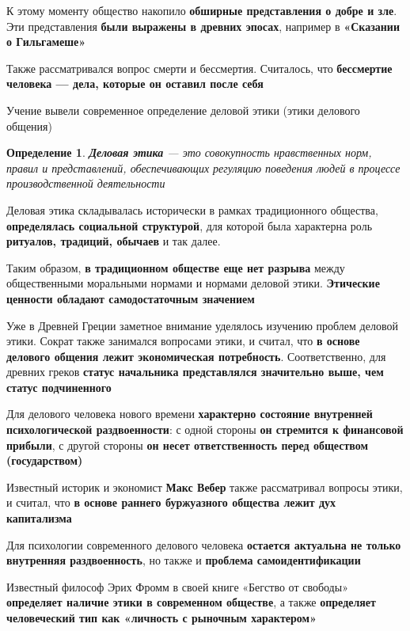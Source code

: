 \documentclass[a4paper,14pt]{extarticle}
\newtheorem{definition}{Определение}
\begin{document}
К этому моменту общество накопило \textbf{обширные представления о добре и зле}. Эти представления \textbf{были выражены в древних эпосах}, например в \textbf{«Сказании о Гильгамеше»}

Также рассматривался вопрос смерти и бессмертия. Считалось, что \textbf{бессмертие человека — дела, которые он оставил после себя}

Учение вывели современное определение деловой этики (этики делового общения)

\begin{definition}
\textbf{Деловая этика} — это совокупность нравственных норм, правил и представлений, обеспечивающих регуляцию поведения людей в процессе производственной деятельности
\end{definition}

Деловая этика складывалась исторически в рамках традиционного общества, \textbf{определялась социальной структурой}, для которой была характерна роль \textbf{ритуалов, традиций, обычаев} и так далее.

Таким образом, \textbf{в традиционном обществе еще нет разрыва} между общественными моральными нормами и нормами деловой этики. \textbf{Этические ценности обладают самодостаточным значением}

Уже в Древней Греции заметное внимание уделялось изучению проблем деловой этики. Сократ также занимался вопросами этики, и считал, что \textbf{в основе делового общения лежит экономическая потребность}. Соответственно, для древних греков \textbf{статус начальника представлялся значительно выше, чем статус подчиненного}

\hfill

Для делового человека нового времени \textbf{характерно состояние внутренней психологической раздвоенности}: с одной стороны \textbf{он стремится к финансовой прибыли}, с другой стороны \textbf{он несет ответственность перед обществом (государством)}

Известный историк и экономист \textbf{Макс Вебер} также рассматривал вопросы этики, и считал, что \textbf{в основе раннего буржуазного общества лежит дух капитализма}

Для психологии современного делового человека \textbf{остается актуальна не только внутренняя раздвоенность}, но также и \textbf{проблема самоидентификации}

Известный философ Эрих Фромм в своей книге «Бегство от свободы» \textbf{определяет наличие этики в современном обществе}, а также \textbf{определяет человеческий тип как «личность с рыночным характером»}
\end{document}
